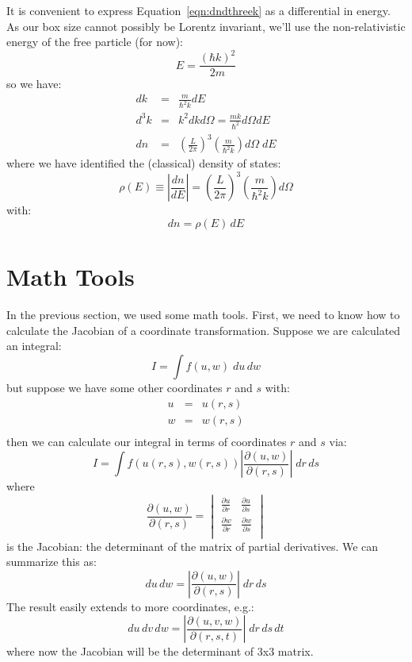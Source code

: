 \documentclass[12pt]{article}
\begin{document}
It is convenient to express Equation~\ref{eqn:dndthreek} as a differential in energy.  As our box size cannot possibly be Lorentz invariant, we'll use the non-relativistic energy of the free particle (for now):
$$E=\frac{(\hbar k)^2}{2 m}$$
so we have:
\begin{eqnarray*}
dk   &=& \frac{m}{\hbar^2 k} dE \\[4pt]
d^3k &=& k^2 dk d\Omega = \frac{m k }{\hbar^2} d\Omega dE \\[4pt]
dn   &=& \left( \frac{L}{2\pi} \right)^3 \left(\frac{m}{\hbar^2 k}\right) d\Omega \; dE
\end{eqnarray*}
where we have identified the (classical) density of states:
\begin{equation}
 \rho(E) \equiv \left| \frac{dn}{dE} \right| = \left( \frac{L}{2\pi} \right)^3 \left(\frac{m}{\hbar^2 k}\right) d\Omega
\end{equation}
with:
\begin{equation}
 dn = \rho(E) \, dE
\end{equation}

\section{Math Tools}

In the previous section, we used some math tools.  First, we need to know how to calculate the Jacobian of a coordinate transformation.  Suppose we are calculated an integral:
$$I = \int f(u,w) \; du \, dw$$
but suppose we have some other coordinates $r$ and $s$ with:
\begin{eqnarray*}
  u &=& u(r,s) \\
  w &=& w(r,s) \\
\end{eqnarray*}
then we can calculate our integral in terms of coordinates $r$ and $s$ via:
$$I = \int f( u(r,s), w(r,s) ) \left| \frac{\partial(u,w)}{\partial(r,s)}\right| \; dr \, ds$$
where
\begin{equation*}
\frac{\partial(u,w)}{\partial(r,s)} =
\begin{vmatrix}
  \frac{\partial u}{\partial r} & \frac{\partial u}{\partial s} \\[5pt]
  \frac{\partial w}{\partial r} & \frac{\partial w}{\partial s} \\[5pt]
\end{vmatrix}
\end{equation*}
is the Jacobian:  the determinant of the matrix of partial derivatives.  We can summarize this as:
$$du\,dw = \left| \frac{\partial(u,w)}{\partial(r,s)} \right| \; dr \, ds $$
The result easily extends to more coordinates, e.g.:
$$du\,dv\,dw = \left| \frac{\partial(u,v,w)}{\partial(r,s,t)} \right| \; dr \, ds \, dt$$
where now the Jacobian will be the determinant of 3x3 matrix.
\end{document}
